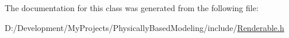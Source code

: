 The documentation for this class was generated from the following file\-:\begin{DoxyCompactItemize}
\item 
D\-:/\-Development/\-My\-Projects/\-Physically\-Based\-Modeling/include/\hyperlink{_renderable_8h}{Renderable.\-h}\end{DoxyCompactItemize}
